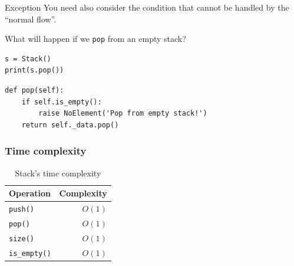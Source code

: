 \documentclass[aspectratio=169, 14pt]{beamer}
\begin{document}
\begin{frame}[fragile]
\begin{block}{Exception}
    You need also consider the condition that cannot be handled by the ``normal flow''.
\end{block}

What will happen if we \texttt{pop} from an empty stack?
\begin{verbatim}
s = Stack()
print(s.pop())   
\end{verbatim}

\pause

\begin{verbatim}
def pop(self):
    if self.is_empty():
        raise NoElement('Pop from empty stack!')
    return self._data.pop()  
\end{verbatim}

\end{frame}

\begin{frame}
    \frametitle{Time complexity}
    \begin{table}
        \caption{Stack's time complexity}
        \begin{tabular}{lr}
          \toprule
          Operation & Complexity\\
          \midrule
          \texttt{push()} & $O(1)$\\
          \texttt{pop()} & $O(1)$ \\
          \texttt{size()} & $O(1)$ \\
          \texttt{is\_empty()} & $O(1)$ \\ 
          \bottomrule
        \end{tabular}
    \end{table}

\end{frame}
\end{document}
